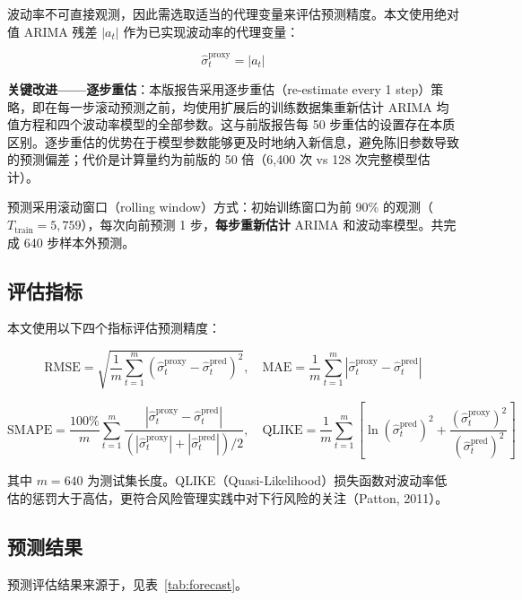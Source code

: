 \documentclass[12pt,a4paper]{article}
\begin{document}
波动率不可直接观测，因此需选取适当的代理变量来评估预测精度。本文使用绝对值 ARIMA 残差 $|a_t|$ 作为已实现波动率的代理变量：

\begin{equation}
\hat{\sigma}_t^{\text{proxy}} = |a_t|
\label{eq:proxy}
\end{equation}

\medskip
\noindent\textbf{关键改进——逐步重估}：本版报告采用逐步重估（re-estimate every 1 step）策略，即在每一步滚动预测之前，均使用扩展后的训练数据集重新估计 ARIMA 均值方程和四个波动率模型的全部参数。这与前版报告每 50 步重估的设置存在本质区别。逐步重估的优势在于模型参数能够更及时地纳入新信息，避免陈旧参数导致的预测偏差；代价是计算量约为前版的 50 倍（6{,}400 次 vs 128 次完整模型估计）。

预测采用滚动窗口（rolling window）方式：初始训练窗口为前 90\% 的观测（$T_{\text{train}} = 5{,}759$），每次向前预测 1 步，\textbf{每步重新估计} ARIMA 和波动率模型。共完成 640 步样本外预测。

\subsection{评估指标}

本文使用以下四个指标评估预测精度：

\[
\mathrm{RMSE} = \sqrt{\frac{1}{m}\sum_{t=1}^{m} (\hat{\sigma}_t^{\text{proxy}} - \hat{\sigma}_t^{\text{pred}})^2}, \quad
\mathrm{MAE} = \frac{1}{m}\sum_{t=1}^{m} \left| \hat{\sigma}_t^{\text{proxy}} - \hat{\sigma}_t^{\text{pred}} \right|
\]

\[
\mathrm{SMAPE} = \frac{100\%}{m}\sum_{t=1}^{m} \frac{|\hat{\sigma}_t^{\text{proxy}} - \hat{\sigma}_t^{\text{pred}}|}
{(|\hat{\sigma}_t^{\text{proxy}}| + |\hat{\sigma}_t^{\text{pred}}|) / 2}, \quad
\mathrm{QLIKE} = \frac{1}{m}\sum_{t=1}^{m} \left[ \ln(\hat{\sigma}_t^{\text{pred}})^2 + \frac{(\hat{\sigma}_t^{\text{proxy}})^2}{(\hat{\sigma}_t^{\text{pred}})^2} \right]
\]

其中 $m = 640$ 为测试集长度。QLIKE（Quasi-Likelihood）损失函数对波动率低估的惩罚大于高估，更符合风险管理实践中对下行风险的关注（Patton, 2011）。

\subsection{预测结果}

预测评估结果来源于，见表~\ref{tab:forecast}。
\end{document}
